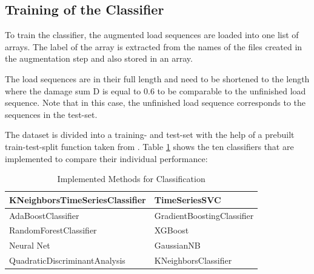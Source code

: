\subsection{Training of the Classifier}
To train the classifier, the augmented load sequences are loaded into one list of arrays. The label of the array is extracted from the names of the files created in the augmentation step and also stored in an array. 

The load sequences are in their full length and need to be shortened to the length where the damage sum D is equal to 0.6 to be comparable to the unfinished load sequence. Note that in this case, the unfinished load sequence corresponds to the sequences in the test-set. 


The dataset is divided into a training- and test-set with the help of a prebuilt train-test-split function taken from \cite{SKlearn}. Table \ref{methods} shows the ten classifiers that are implemented to compare their individual performance:



\begin{table}
	\begin{center}
		\begin{tabular}{|| l | l ||}\hline
			\rule{0pt}{2ex}KNeighborsTimeSeriesClassifier \cite{tslearn} & TimeSeriesSVC \cite{tslearn}\\	\hline
			AdaBoostClassifier \cite{SKlearn} & GradientBoostingClassifier \cite{SKlearn} \\ \hline
			RandomForestClassifier \cite{SKlearn} & XGBoost\cite{XG}\\ \hline
			Neural Net \cite{SKlearn} & GaussianNB \cite{SKlearn} \\ \hline
			QuadraticDiscriminantAnalysis \cite{SKlearn} & KNeighborsClassifier \cite{SKlearn} \\ \hline
		\end{tabular}
		\caption{Implemented Methods for Classification}
		\label{methods}
	\end{center}
	\vspace{-4mm}
\end{table}

